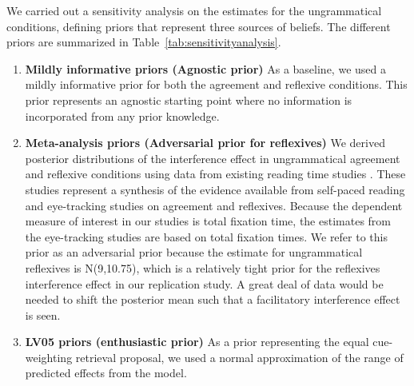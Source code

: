 \documentclass{cambridge7A}\usepackage[]{graphicx}\usepackage[]{color}
\begin{document}
We carried out a sensitivity analysis on the estimates for the  ungrammatical conditions, defining priors that represent three sources of beliefs. The different priors are summarized in Table~\ref{tab:sensitivityanalysis}. 

\begin{enumerate}
\item \textbf{Mildly informative priors (Agnostic prior)} As a baseline, we used a mildly informative prior for both the agreement and reflexive conditions. This prior represents an agnostic starting point where no information is incorporated from any prior knowledge.
\item \textbf{Meta-analysis priors (Adversarial prior for reflexives)}
We derived posterior distributions of the interference effect in ungrammatical agreement and reflexive conditions using data from existing reading time studies \citep{JaegerEngelmannVasishth2017}. These studies represent a synthesis of the evidence available from self-paced reading and eye-tracking studies on agreement and reflexives. Because the dependent measure of interest in our studies is total fixation time, the estimates from the eye-tracking studies are based on total fixation times. We refer to this prior as an adversarial prior because the estimate for ungrammatical reflexives is N(9,10.75), which is a relatively tight prior for the reflexives interference effect in our replication study.  A great deal of data would be needed to shift the posterior mean such that a facilitatory interference effect is seen. 
\item \textbf{LV05 priors (enthusiastic prior)} As a prior representing the equal cue-weighting retrieval proposal, we used a normal approximation of the range of predicted effects from the \cite{EngelmannJaegerVasishth2019} model. 
\end{enumerate}
\end{document}
